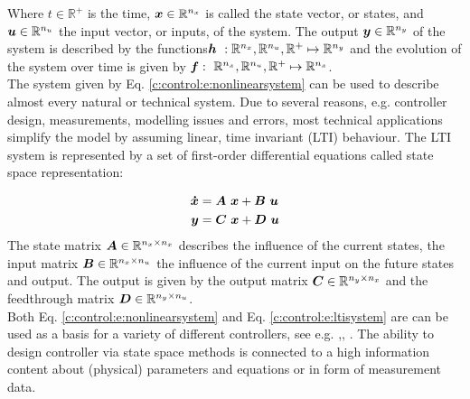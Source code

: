 Where $t \in \mathbb{R}^+$ is the time, $\mbox{\boldmath$x$} \in \mathbb{R}^{n_x}$ is called the state vector, or states, and $\mbox{\boldmath$u$} \in \mathbb{R}^{n_u}$ the input vector, or inputs, of the system. The output $\mbox{\boldmath$y$} \in \mathbb{R}^{n_y}$ of the system is described by the functions$\mbox{\boldmath$h$}~:\mathbb{R}^{n_x},\mathbb{R}^{n_u},\mathbb{R}^+ \mapsto \mathbb{R}^{n_y}$ and the evolution of the system over time is given by $\mbox{\boldmath$f$}:~\mathbb{R}^{n_x},\mathbb{R}^{n_u},\mathbb{R}^+ \mapsto \mathbb{R}^{n_x} $.\\

The system given by Eq. \ref{c:control:e:nonlinearsystem} can be used to describe almost every natural or technical system.\newline
Due to several reasons, e.g. controller design, measurements, modelling issues and errors, most technical applications simplify the model by assuming linear, time invariant (LTI) behaviour. The LTI system is represented by a set of first-order differential equations \cite{Lunze2014} called state space representation:

\begin{align}
\begin{split}
\mbox{\boldmath$\dot{x}$} &= \mbox{\boldmath$A$}~\mbox{\boldmath$x$} + \mbox{\boldmath$B$}~\mbox{\boldmath$u$} \\
\mbox{\boldmath$y$} &= \mbox{\boldmath$C$}~\mbox{\boldmath$x$} + \mbox{\boldmath$D$}~\mbox{\boldmath$u$}
\end{split}
\label{c:control:e:ltisystem}
\end{align}
The state matrix $\mbox{\boldmath$A$} \in \mathbb{R}^{n_x\times n_x}$ describes the influence of the current states, the input matrix $\mbox{\boldmath$B$} \in \mathbb{R}^{n_x\times n_u}$ the influence of the current input on the future states and output. The output is given by the output matrix $\mbox{\boldmath$C$} \in \mathbb{R}^{n_y\times n_x}$ and the feedthrough matrix $\mbox{\boldmath$D$} \in \mathbb{R}^{n_y\times n_u}$.\\

Both Eq. \ref{c:control:e:nonlinearsystem} and Eq. \ref{c:control:e:ltisystem} are can be used as a basis for a variety of different controllers, see e.g. \cite{Adamy2014},\cite{Lunze2014}, \cite{Lunze2016}. The ability to design controller via state space methods is connected to a high information content about (physical) parameters and equations or in form of measurement data.\\

